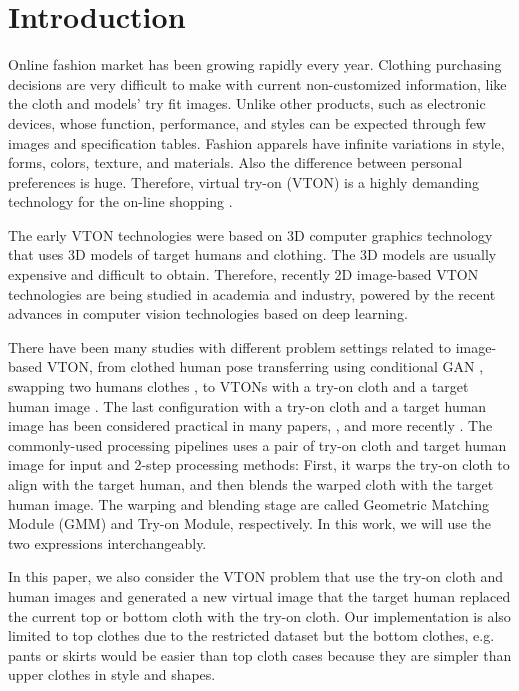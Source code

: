 
\section{Introduction}

Online fashion market has been growing rapidly every year. Clothing purchasing decisions are very difficult to make with current non-customized information, like the cloth and models' try fit images. Unlike other products, such as electronic devices, whose function, performance, and styles can be expected through few images and specification tables. Fashion apparels have infinite variations in style, forms, colors, texture, and materials.  Also the difference between personal preferences is huge. Therefore, virtual try-on (VTON) is a highly demanding technology for the on-line shopping \cite{zhang2019role}. 

The early VTON technologies were based on 3D computer graphics technology that uses 3D models of target humans and clothing. The 3D models are usually expensive and difficult to obtain. Therefore, recently 2D image-based VTON technologies are being studied in academia and industry, powered by the recent advances in computer vision technologies based on deep learning. 

There have been many studies with different problem settings related to image-based VTON, from clothed human pose transferring using conditional GAN \cite{ma2017pose}, swapping two humans clothes \cite{jetchev2017conditional}, to VTONs with a try-on cloth and a target human image \cite{Han2017VITONAI}. The last configuration with a try-on cloth and a target human image has been considered practical in many papers, \cite{Han2017VITONAI,Wang2018TowardCI}, and more recently \cite{Sun2019ImageBasedVT,Yu_2019_ICCV,jae2019viton}. The commonly-used processing pipelines uses a pair of try-on cloth and target human image for input and 2-step processing methods: First, it warps the try-on cloth to align with the target human, and then blends the warped cloth with the
target human image. The warping and blending stage are called Geometric Matching Module (GMM) and Try-on Module, respectively. In this work, we will use the two expressions interchangeably.


In this paper, we also consider the VTON problem that use the try-on cloth and human images and generated a new virtual image that the target human replaced the current top or bottom cloth with the try-on cloth. Our implementation is also limited to top clothes due to the restricted dataset but the bottom clothes, e.g. pants or skirts would be easier than top cloth cases because they are simpler than upper clothes in style and shapes.

